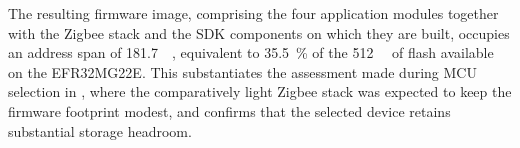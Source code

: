 The resulting firmware image, comprising the four application modules together with the Zigbee stack and the SDK components on which they are built, occupies an address span of \SI{181.7}{\kilo\byte}, equivalent to \SI{35.5}{\percent} of the \SI{512}{\kilo\byte} of flash available on the EFR32MG22E. This substantiates the assessment made during MCU selection in , where the comparatively light Zigbee stack was expected to keep the firmware footprint modest, and confirms that the selected device retains substantial storage headroom.

